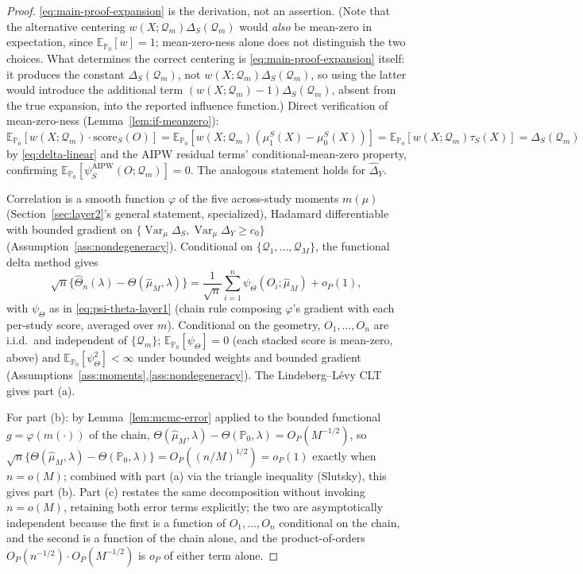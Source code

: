 \documentclass[11pt]{article}
\theoremstyle{plain}
\theoremstyle{definition}
\theoremstyle{remark}
\newcommand{\E}{\mathbb{E}}
\newcommand{\PP}{\mathbb{P}}
\newcommand{\Q}{\mathcal{Q}}
\newcommand{\Qhat}{\widehat{\mu}_M}
\newcommand{\Thetahat}{\widehat{\Theta}}
\DeclareMathOperator{\Var}{Var}
\begin{document}
\begin{proof}
\eqref{eq:main-proof-expansion} is the derivation, not an assertion. (Note that the
alternative centering $w(X;\Q_m)\Delta_S(\Q_m)$ would \emph{also} be mean-zero in
expectation, since $\E_{\PP_0}[w]=1$; mean-zero-ness alone does not distinguish the
two choices. What determines the correct centering is \eqref{eq:main-proof-expansion}
itself: it produces the constant $\Delta_S(\Q_m)$, not $w(X;\Q_m)\Delta_S(\Q_m)$, so
using the latter would introduce the additional term $(w(X;\Q_m)-1)\Delta_S(\Q_m)$,
absent from the true expansion, into the reported influence function.) Direct
verification of mean-zero-ness (Lemma~\ref{lem:if-meanzero}):
$\E_{\PP_0}[w(X;\Q_m)\cdot\mathrm{score}_S(O)]=\E_{\PP_0}[w(X;\Q_m)(\mu_1^S(X)-\mu_0^S(X))]=\E_{\PP_0}[w(X;\Q_m)\tau_S(X)]=\Delta_S(\Q_m)$
by \eqref{eq:delta-linear} and the AIPW residual terms' conditional-mean-zero
property, confirming $\E_{\PP_0}[\psi_S^{\mathrm{AIPW}}(O;\Q_m)]=0$. The analogous
statement holds for $\hat\Delta_Y$.

Correlation is a smooth function $\varphi$ of the five across-study moments $m(\mu)$
(Section~\ref{sec:layer2}'s general statement, specialized), Hadamard differentiable
with bounded gradient on $\{\Var_\mu\Delta_S,\Var_\mu\Delta_Y\ge c_0\}$
(Assumption~\ref{ass:nondegeneracy}). Conditional on $\{\Q_1,\dots,\Q_M\}$, the
functional delta method gives
\[
    \sqrt n\{\Thetahat_n(\lambda)-\Theta(\Qhat,\lambda)\}
    = \frac1{\sqrt n}\sum_{i=1}^n\psi_\Theta(O_i;\Qhat) + o_P(1),
\]
with $\psi_\Theta$ as in \eqref{eq:psi-theta-layer1} (chain rule composing $\varphi$'s
gradient with each per-study score, averaged over $m$). Conditional on the geometry,
$O_1,\dots,O_n$ are i.i.d.\ and independent of $\{\Q_m\}$; $\E_{\PP_0}[\psi_\Theta]=0$
(each stacked score is mean-zero, above) and $\E_{\PP_0}[\psi_\Theta^2]<\infty$ under
bounded weights and bounded gradient (Assumptions~\ref{ass:moments},\ref{ass:nondegeneracy}).
The Lindeberg--L\'evy CLT gives part (a).

For part (b): by Lemma~\ref{lem:mcmc-error} applied to the bounded functional
$g=\varphi(m(\cdot))$ of the chain, $\Theta(\Qhat,\lambda)-\Theta(\PP_0,\lambda)=O_P(M^{-1/2})$,
so $\sqrt n\{\Theta(\Qhat,\lambda)-\Theta(\PP_0,\lambda)\}=O_P((n/M)^{1/2})=o_P(1)$
exactly when $n=o(M)$; combined with part (a) via the triangle inequality (Slutsky),
this gives part (b). Part (c) restates the same decomposition without invoking
$n=o(M)$, retaining both error terms explicitly; the two are asymptotically
independent because the first is a function of $O_1,\dots,O_n$ conditional on the
chain, and the second is a function of the chain alone, and the product-of-orders
$O_P(n^{-1/2})\cdot O_P(M^{-1/2})$ is $o_P$ of either term alone.
\end{proof}
\end{document}
